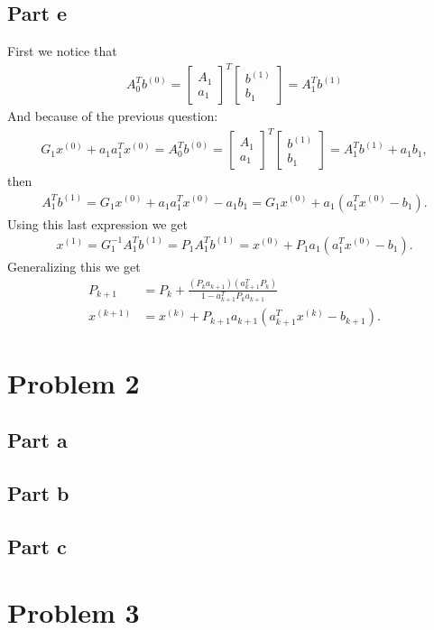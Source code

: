 \documentclass{article}
\begin{document}
\subsection*{Part e}
First we notice that
\begin{align*}
	A_0^Tb^{(0)}=\begin{bmatrix}
	A_1\\	
	a_1
	\end{bmatrix}^T
	\begin{bmatrix}
		b^{(1)}\\
		b_1
	\end{bmatrix}
	=
	A_1^Tb^{(1)}
\end{align*}
And because of the previous question:
\begin{align*}
	G_1x^{(0)}+a_1a_1^Tx^{(0)}=
	A_0^Tb^{(0)}=\begin{bmatrix}
	A_1\\	
	a_1
	\end{bmatrix}^T
	\begin{bmatrix}
		b^{(1)}\\
		b_1
	\end{bmatrix}
	=
	A_1^Tb^{(1)}+a_1b_1,
\end{align*}
then
\begin{align*}
A_1^Tb^{(1)} = G_1x^{(0)}+a_1a_1^Tx^{(0)}-a_1b_1=G_1x^{(0)}+a_1(a_1^Tx^{(0)}-b_1).
\end{align*}
Using this last expression we get
\begin{align*}
	x^{(1)}=G_1^{-1}A_1^Tb^{(1)}=P_1A_1^Tb^{(1)}=x^{(0)}+P_1a_1(a_1^Tx^{(0)}-b_1).
\end{align*}
Generalizing this we get
\begin{align*}
	P_{k+1}&=P_k+\frac{(P_ka_{k+1})(a_{k+1}^TP_k)}{1-a_{k+1}^TP_ka_{k+1}}\\
	x^{(k+1)}&=x^{(k)}+P_{k+1}a_{k+1}(a_{k+1}^Tx^{(k)}-b_{k+1}).
\end{align*}
\section*{Problem 2}
\subsection*{Part a}
\subsection*{Part b}
\subsection*{Part c}
\section*{Problem 3}
\end{document}
